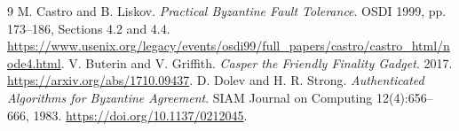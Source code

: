 \documentclass[11pt,a4paper,onecolumn]{article}
\theoremstyle{remark}\newtheorem{example}[definition]{Example}
\begin{document}
\begin{thebibliography}{9}\small
\setlength{\itemsep}{2pt}
 M. Castro and B. Liskov.
\emph{Practical Byzantine Fault Tolerance}. OSDI 1999, pp. 173--186,
Sections 4.2 and 4.4.
\url{https://www.usenix.org/legacy/events/osdi99/full_papers/castro/castro_html/node4.html}.
 V. Buterin and V. Griffith.
\emph{Casper the Friendly Finality Gadget}. 2017.
\url{https://arxiv.org/abs/1710.09437}.
 D. Dolev and H. R. Strong.
\emph{Authenticated Algorithms for Byzantine Agreement}.
SIAM Journal on Computing 12(4):656--666, 1983.
\url{https://doi.org/10.1137/0212045}.

\end{thebibliography}
\end{document}
